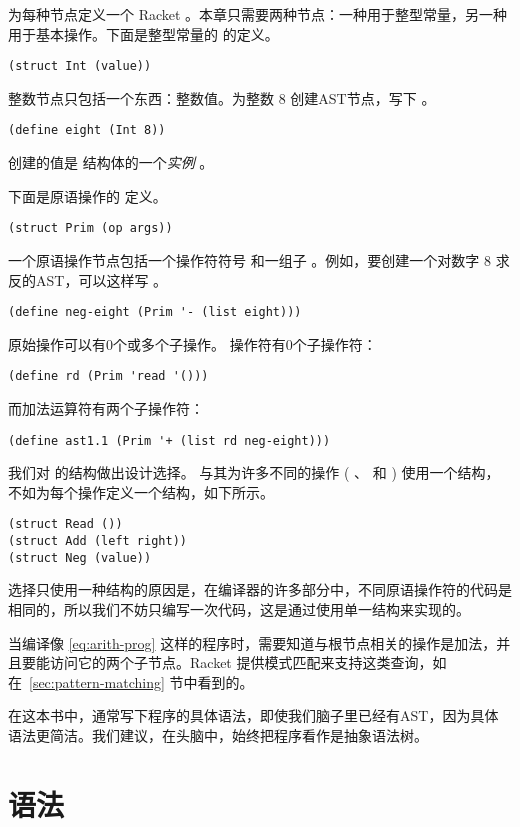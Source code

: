 \documentclass[11pt]{book}
\begin{document}
为每种节点定义一个 Racket  。本章只需要两种节点：一种用于整型常量，另一种用于基本操作。下面是整型常量的
 的定义。
\begin{lstlisting}
(struct Int (value))
\end{lstlisting}
整数节点只包括一个东西：整数值。为整数 $8$ 创建AST节点，写下  。
\begin{lstlisting}
(define eight (Int 8))
\end{lstlisting}
 创建的值是 结构体的一个\emph{实例} 。

下面是原语操作的  定义。
\begin{lstlisting}
(struct Prim (op args))
\end{lstlisting}
一个原语操作节点包括一个操作符符号
和一组子  。例如，要创建一个对数字 $8$ 求反的AST，可以这样写 。
\begin{lstlisting}
(define neg-eight (Prim '- (list eight)))
\end{lstlisting}
原始操作可以有0个或多个子操作。 操作符有0个子操作符：
\begin{lstlisting}
(define rd (Prim 'read '()))
\end{lstlisting}
而加法运算符有两个子操作符：
\begin{lstlisting}
(define ast1.1 (Prim '+ (list rd neg-eight)))
\end{lstlisting}

我们对 的结构做出设计选择。
与其为许多不同的操作
( 、 \code{+} 和 \code{-}) 使用一个结构，不如为每个操作定义一个结构，如下所示。
\begin{lstlisting}
(struct Read ())
(struct Add (left right))
(struct Neg (value))
\end{lstlisting}
选择只使用一种结构的原因是，在编译器的许多部分中，不同原语操作符的代码是相同的，所以我们不妨只编写一次代码，这是通过使用单一结构来实现的。

当编译像 \eqref{eq:arith-prog} 这样的程序时，需要知道与根节点相关的操作是加法，并且要能访问它的两个子节点。Racket 提供模式匹配来支持这类查询，如在~\ref{sec:pattern-matching} 节中看到的。

在这本书中，通常写下程序的具体语法，即使我们脑子里已经有AST，因为具体语法更简洁。我们建议，在头脑中，始终把程序看作是抽象语法树。

\section{语法}
\label{sec:grammar}
\end{document}
